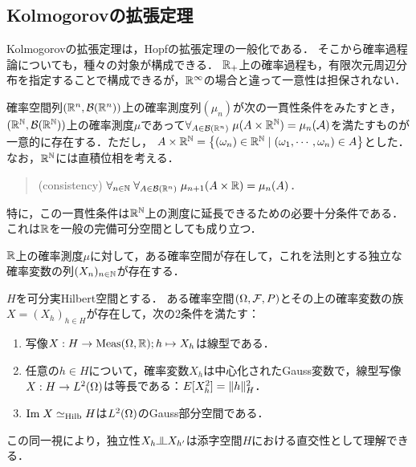 \documentclass[uplatex,dvipdfmx]{jsreport}
\begin{document}
\subsection{Kolmogorovの拡張定理}

\begin{tcolorbox}[colframe=ForestGreen, colback=ForestGreen!10!white,breakable,colbacktitle=ForestGreen!40!white,coltitle=black,fonttitle=\bfseries\sffamily,
    title=]
    Kolmogorovの拡張定理は，Hopfの拡張定理の一般化である．
    そこから確率過程論についても，種々の対象が構成できる．
    $\mathbb{R}_+$上の確率過程も，有限次元周辺分布を指定することで構成できるが，$\mathbb{R}^\infty$の場合と違って一意性は担保されない．
\end{tcolorbox}

\begin{theorem}
    確率空間列$(\mathbb{R}^n,\mathcal{B}(\mathbb{R}^n))$上の確率測度列$(\mu_n)$が次の一貫性条件をみたすとき，$(\mathbb{R}^{\mathbb{N}},\mathcal{B}(\mathbb{R}^{\mathbb{N}}))$上の確率測度$\mu$であって$\forall_{A\in\mathcal{B}(\mathbb{R}^n)}\;\mu(A\times\mathbb{R}^{\mathbb{N}})=\mu_n(\mathcal{A})$を満たすものが一意的に存在する．ただし，
    $A\times\mathbb{R}^{\mathbb{N}}=\left\{(\omega_n)\in\mathbb{R}^{\mathbb{N}}\mid (\omega_1,\cdots,\omega_n)\in A\right\}$とした．
    なお，$\mathbb{R}^{\mathbb{N}}$には直積位相を考える．
    \begin{quotation}
        (consistency) $\forall_{n\in\mathbb{N}}\;\forall_{A\in\mathcal{B}(\mathbb{R}^n)}\;\mu_{n+1}(A\times\mathbb{R})=\mu_n(A)$．
    \end{quotation}
    特に，この一貫性条件は$\mathbb{R}^{\mathbb{N}}$上の測度に延長できるための必要十分条件である．
    これは$\mathbb{R}$を一般の完備可分空間としても成り立つ．
\end{theorem}

\begin{corollary}
    $\mathbb{R}$上の確率測度$\mu$に対して，ある確率空間が存在して，これを法則とする独立な確率変数の列$(X_n)_{n\in\mathbb{N}}$が存在する．
\end{corollary}

\begin{corollary}[Hilbert空間により添字付けられた確率過程]
    $H$を可分実Hilbert空間とする．
    ある確率空間$(\Omega,\mathcal{F},P)$とその上の確率変数の族$X=(X_h)_{h\in H}$が存在して，次の2条件を満たす：
    \begin{enumerate}
        \item 写像$X:H\to\mathrm{Meas}(\Omega,\mathbb{R});h\mapsto X_h$は線型である．
        \item 任意の$h\in H$について，確率変数$X_h$は中心化されたGauss変数で，線型写像$X:H\to L^2(\Omega)$は等長である：$E[X_h^2]=\|h\|^2_H$．
        \item $\mathrm{Im}\; X\simeq_{\mathrm{Hilb}} H$は$L^2(\Omega)$のGauss部分空間である．
    \end{enumerate}
\end{corollary}
\begin{remark}
    この同一視により，独立性$X_h\indep X_{h'}$は添字空間$H$における直交性として理解できる．
\end{remark}
\end{document}
